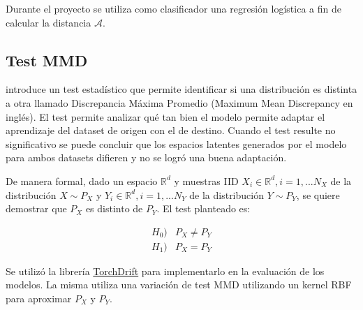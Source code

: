 Durante el proyecto se utiliza como clasificador una regresi\'on log\'istica a fin de calcular la distancia
$\mathcal{A}$.

\subsection{Test MMD}

\cite{gretton2012kernel} introduce un test estad\'istico que permite identificar si una distribuci\'on es distinta a
otra llamado Discrepancia M\'axima Promedio (Maximum Mean Discrepancy en ingl\'es). El test permite analizar qu\'e tan
bien el modelo permite adaptar el aprendizaje del dataset de origen con el de destino. Cuando el test resulte no
significativo se puede concluir que los espacios latentes generados por el modelo para ambos datasets difieren y no se
logr\'o una buena adaptaci\'on.

De manera formal, dado un espacio $\mathbb{R}^d$ y muestras IID $X_i \in \mathbb{R}^d, i=1,...N_X$ de la distribuci\'on
$X \sim P_X$ y $Y_i \in \mathbb{R}^d, i=1,...N_Y$ de la distribuci\'on $Y \sim P_Y$, se quiere demostrar que $P_X$ es
distinto de $P_Y$. El test planteado es:

\begin{align}
    H_0) & P_X \neq P_Y \nonumber \\
    H_1) & P_X = P_Y
\end{align}

Se utiliz\'o la librer\'ia \href{https://github.com/torchdrift/torchdrift/}{TorchDrift} para implementarlo en la
evaluaci\'on de los modelos. La misma utiliza una variaci\'on de test MMD utilizando un kernel RBF para aproximar $P_X$
y $P_Y$.

